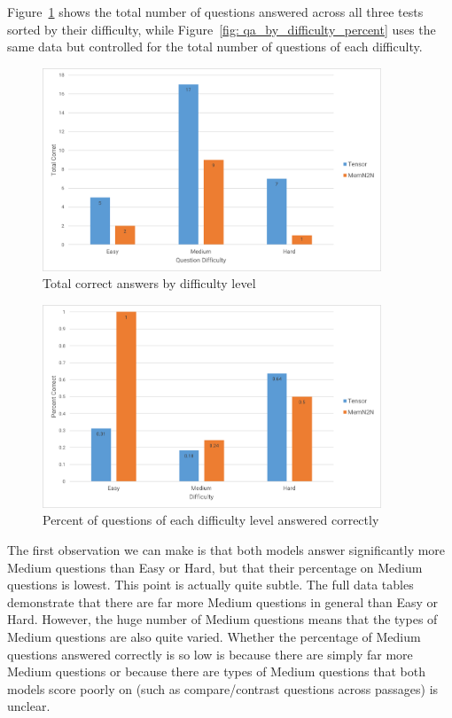 \documentclass[pageno]{final_paper}
\begin{document}
Figure~\ref{fig: qa_by_difficulty} shows the total number of questions answered
across all three tests sorted by their difficulty, while Figure~\ref{fig:
qa_by_difficulty_percent} uses the same data but controlled for the total number
of questions of each difficulty.

\begin{figure}[!tb]
    \centering
    \includegraphics[width=0.9\textwidth,keepaspectratio]{figures/qa_by_difficulty.png}
    \caption{Total correct answers by difficulty level}
    \label{fig: qa_by_difficulty}
\end{figure}

\begin{figure}[!bt]
    \centering
    \includegraphics[width=0.9\textwidth,keepaspectratio]{figures/qa_by_difficulty_percent.png}
    \caption{Percent of questions of each difficulty level answered correctly}
    \label{fig: qa_by_difficulty_percent}
\end{figure}

The first observation we can make is that both models answer significantly more
Medium questions than Easy or Hard, but that their percentage on Medium
questions is lowest. This point is actually quite subtle. The full data tables
demonstrate that there are far more Medium questions in general than Easy or
Hard. However, the huge number of Medium questions means that the types of
Medium questions are also quite varied. Whether the percentage of Medium
questions answered correctly is so low is because there are simply far more
Medium questions or because there are types of Medium questions that both models
score poorly on (such as compare/contrast questions across passages) is unclear.
\end{document}
